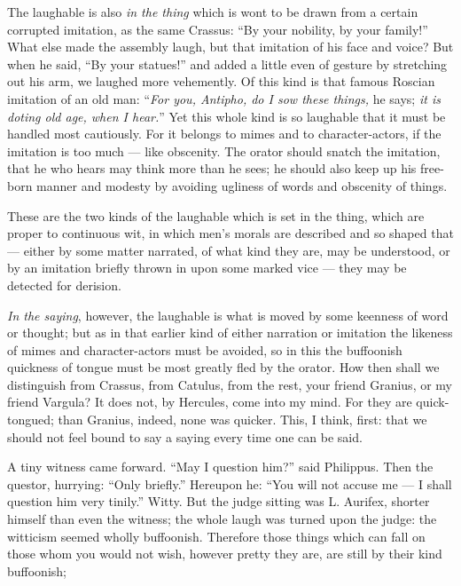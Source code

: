  The laughable is also \textit{in the thing} which is wont to be drawn from a certain corrupted imitation, as the same Crassus: ``By your nobility, by your family!'' What else made the assembly laugh, but that imitation of his face and voice? But when he said, ``By your statues!'' and added a little even of gesture by stretching out his arm, we laughed more vehemently. Of this kind is that famous Roscian imitation of an old man: ``\textit{For you, Antipho, do I sow these things,} he says; \textit{it is doting old age, when I hear.}'' Yet this whole kind is so laughable that it must be handled most cautiously. For it belongs to mimes and to character-actors, if the imitation is too much — like obscenity. The orator should snatch the imitation, that he who hears may think more than he sees; he should also keep up his free-born manner and modesty by avoiding ugliness of words and obscenity of things.

 These are the two kinds of the laughable which is set in the thing, which are proper to continuous wit, in which men's morals are described and so shaped that — either by some matter narrated, of what kind they are, may be understood, or by an imitation briefly thrown in upon some marked vice — they may be detected for derision.

 \textit{In the saying}, however, the laughable is what is moved by some keenness of word or thought; but as in that earlier kind of either narration or imitation the likeness of mimes and character-actors must be avoided, so in this the buffoonish quickness of tongue must be most greatly fled by the orator. How then shall we distinguish from Crassus, from Catulus, from the rest, your friend Granius, or my friend Vargula? It does not, by Hercules, come into my mind. For they are quick-tongued; than Granius, indeed, none was quicker. This, I think, first: that we should not feel bound to say a saying every time one can be said.

 A tiny witness came forward. ``May I question him?'' said Philippus. Then the questor, hurrying: ``Only briefly.'' Hereupon he: ``You will not accuse me — I shall question him very tinily.'' Witty. But the judge sitting was L. Aurifex, shorter himself than even the witness; the whole laugh was turned upon the judge: the witticism seemed wholly buffoonish. Therefore those things which can fall on those whom you would not wish, however pretty they are, are still by their kind buffoonish;

